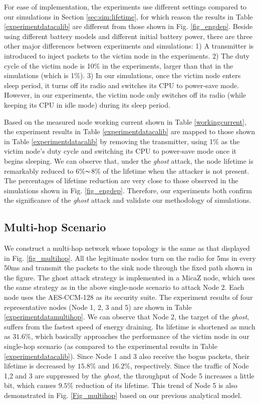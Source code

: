 \documentclass[10pt,journal,cspaper,compsoc]{IEEEtran}
\begin{document}
For ease of implementation, the experiments use different settings compared to our simulations in Section \ref{sec:sim:lifetime}, for which reason the results in Table \ref{experimentdatacalib} are different from those shown in Fig. \ref{fig_engdep}. Beside using different battery models and different initial battery power, there are three other major differences between experiments and simulations: 1) A transmitter is introduced to inject packets to the victim node in the experiments. 2) The duty cycle of the victim node is 10\% in the experiments, larger than that in the simulations (which is 1\%). 3) In our simulations, once the victim node enters sleep period, it turns off its radio and switches its CPU to power-save mode. However, in our experiments, the victim node only switches off its radio (while keeping its CPU in idle mode) during its sleep period.

Based on the measured node working current shown in Table \ref{workingcurrent}, the experiment results in Table \ref{experimentdatacalib} are mapped to those shown in Table \ref{experimentdatacalib} by removing the transmitter, using 1\% as the victim node's duty cycle and switching its CPU to power-save mode once it begins sleeping. We can observe that, under the {\em ghost} attack, the node lifetime is remarkably reduced to 6\%$\thicksim$8\% of the lifetime when the attacker is not present. The percentages of lifetime reduction are very close to those observed in the simulations shown in Fig. \ref{fig_engdep}. Therefore, our experiments both confirm the significance of the {\em ghost} attack and validate our methodology of simulations.

\subsection{Multi-hop Scenario}
We construct a multi-hop network whose topology is the same as that displayed in Fig. \ref{fig_multihop}. All the legitimate nodes turn on the radio for 5ms in every 50ms and transmit the packets to the sink node through the fixed path shown in the figure. The ghost attack strategy is implemented in a MicaZ node, which uses the same strategy as in the above single-node scenario to attack Node 2. Each node uses the AES-CCM-128 as its security suite. The experiment results of four representative nodes (Node 1, 2, 3 and 5) are shown in Table \ref{experimentdatamultihop}. We can observe that Node 2, the target of the {\em ghost}, suffers from the fastest speed of energy draining. Its lifetime is shortened as much as $31.6\%$, which basically approaches the performance of the victim node in our single-hop scenario (as compared to the experimental results in Table \ref{experimentdatacalib}). Since Node 1 and 3 also receive the bogus packets, their lifetime is decreased by $15.8\%$ and $16.2\%$, respectively. Since the traffic of Node 1,2 and 3 are suppressed by the {\em ghost}, the throughput of Node 5 increases a little bit, which causes $9.5\%$ reduction of its lifetime. This trend of Node 5 is also demonstrated in Fig. \ref{Fig_multihop} based on our previous analytical model.
\end{document}
